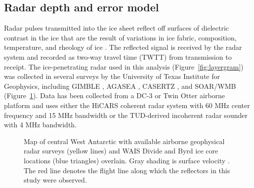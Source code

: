 


\subsection{Radar depth and error model}
 Radar pulses transmitted into the ice sheet reflect off surfaces of dielectric contrast in the ice that are the result of variations in ice fabric, composition, temperature, and rheology of ice \citep{fujita2000}. The reflected signal is received by the radar system and recorded as two-way travel time (TWTT) from transmission to receipt.  The ice-penetrating radar used in this analysis (Figure~\ref{fig:layergram}) was collected in several surveys by the University of Texas Institute for Geophysics, including GIMBLE \citep{gimble}, AGASEA \citep{holt2006}, CASERTZ \citep{morse2002}, and SOAR/WMB \citep{luyendyk2003} (Figure~\ref{fig:radarmap}). Data has been collected from a DC-3 or Twin Otter airborne platform and uses either the HiCARS coherent radar system with 60 MHz center frequency and 15 MHz bandwidth \citep{peters2005} or the TUD-derived incoherent radar sounder \citep{blankenship2001} with 4 MHz bandwidth.

\begin{figure}[h]
\centering
{}
\caption{Map of central West Antarctic with available airborne geophysical radar surveys (yellow lines) and  WAIS Divide and Byrd ice core locations (blue triangles) overlain. Gray shading is surface velocity \citep{rignot2011}. The red line denotes the flight line along which the reflectors in this study were observed. }
\label{fig:radarmap}
\end{figure}



